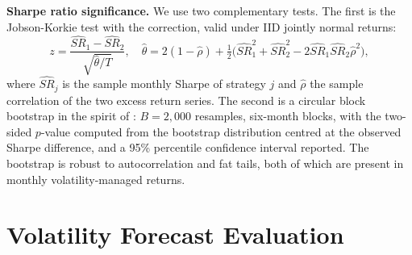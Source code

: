 \documentclass[12pt, a4paper]{article}
\begin{document}
\textbf{Sharpe ratio significance.} We use two complementary tests. The first is the
Jobson-Korkie test with the \citet{memmel2003} correction, valid under IID jointly normal
returns:
\begin{equation}
z = \frac{\widehat{SR}_1 - \widehat{SR}_2}{\sqrt{\hat\theta/T}},
\quad
\hat\theta = 2(1-\hat\rho) + \tfrac{1}{2}\bigl(\widehat{SR}_1^2 + \widehat{SR}_2^2 - 2\widehat{SR}_1\widehat{SR}_2\hat\rho^2\bigr),
\end{equation}
where $\widehat{SR}_j$ is the sample monthly Sharpe of strategy $j$ and $\hat\rho$ the
sample correlation of the two excess return series. The second is a circular block
bootstrap in the spirit of \citet{ledoit2008}: $B=2{,}000$ resamples, six-month blocks,
with the two-sided $p$-value computed from the bootstrap distribution centred at the
observed Sharpe difference, and a 95\% percentile confidence interval reported. The
bootstrap is robust to autocorrelation and fat tails, both of which are present in monthly
volatility-managed returns.

\section{Volatility Forecast Evaluation}
\end{document}
